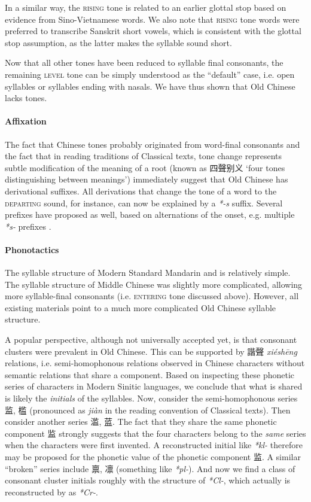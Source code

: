 \documentclass[UTF8, a4paper, oneside, scheme=plain, 12pt]{ctexrep}
\newcommand*{\citepages}[1]{pp.~{#1}}
\newcommand{\form}[1]{\emph{#1}}
\newcommand{\translate}[1]{`#1'}
\newcommand*{\category}[1]{\textsc{#1}}
\begin{document}
In a similar way, the \category{rising} tone is related to an earlier glottal stop
based on evidence from Sino-Vietnamese words.
We also note that \category{rising} tone words were preferred
to transcribe Sanskrit short vowels,
which is consistent with the glottal stop assumption,
as the latter makes the syllable sound short.

Now that all other tones have been reduced to syllable final consonants,
the remaining \category{level} tone can be simply understood as the ``default'' case,
i.e. open syllables or syllables ending with nasals.
We have thus shown that Old Chinese lacks tones.

\paragraph*{Affixation}
The fact that Chinese tones probably originated from word-final consonants
and the fact that in reading traditions of Classical texts,
tone change represents subtle modification of the meaning of a root
(known as 四聲别义 \translate{four tones distinguishing between meanings})
immediately suggest that Old Chinese has derivational suffixes.
All derivations that change the tone of a word to the \category{departing} sound,
for instance, can now be explained by a \form{*-s} suffix.
Several prefixes have proposed as well,
based on alternations of the onset,
e.g. multiple \form{*s-} prefixes \citep[\citepages{53-59}]{baxter2014old}.

\paragraph*{Phonotactics}\label{sec:intro.reconstruction.phonotactics}
The syllable structure of Modern Standard Mandarin and is relatively simple.
The syllable structure of Middle Chinese was slightly more complicated, allowing more syllable-final consonants (i.e. \category{entering} tone discussed above).
However, all existing materials point to a much more complicated Old Chinese syllable structure.

A popular perspective, although not universally accepted yet, is that consonant clusters were prevalent in Old Chinese.
This can be supported by 諧聲 \form{xiéshēng} relations,
i.e. semi-homophonous relations observed in Chinese characters without semantic relations that share a component.
Based on inspecting these phonetic series of characters in Modern Sinitic languages,
we conclude that what is shared is likely the \emph{initials} of the syllables.
Now, consider the semi-homophonous series 监, 槛 (pronounced as \form{jiàn} in the reading convention of Classical texts).
Then consider another series 滥, 蓝.
The fact that they share the same phonetic component 监 strongly suggests that the four characters belong to the \emph{same} series when the characters were first invented.
A reconstructed initial like \form{*kl-} therefore may be proposed for the phonetic value of the phonetic component 监.
A similar ``broken'' series include 禀, 凛 (something like \form{*pl-}).
And now we find a class of consonant cluster initials roughly with the structure of \form{*Cl-},
which actually is reconstructed by \citet[\citepages{50-51}]{baxter2014old} as \form{*Cr-}.
\end{document}
